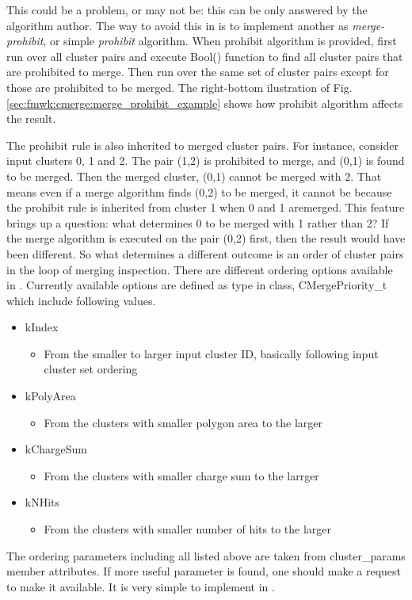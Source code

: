 This could be a problem, or may not be: this can be only answered by the algorithm author.
The way to avoid this in {\cmerge} is to implement another {\cmalgo} as {\it merge-prohibit}, or simple {\it prohibit} algorithm.
When prohibit algorithm is provided, {\cmerge} first run over all cluster pairs and execute {\ttfamily Bool()} function to find all cluster pairs that are prohibited to merge.
Then {\cmerge} run over the same set of cluster pairs except for those are prohibited to be merged.
The right-bottom ilustration of Fig.\ref{sec:fmwk:cmerge:merge_prohibit_example} shows how prohibit algorithm affects the result.

The prohibit rule is also inherited to merged cluster pairs. For instance, consider input clusters 0, 1 and 2. The pair (1,2) is prohibited to merge, and (0,1) is found to be merged. Then the merged cluster, (0,1) cannot be merged with 2. That means even if a merge algorithm finds (0,2) to be merged, it cannot be because the prohibit rule is inherited from cluster 1 when 0 and 1 aremerged. This feature brings up a question: what determines 0 to be merged with 1 rather than 2? If the merge algorithm is executed on the pair (0,2) first, then the result would have been different. So what determines a different outcome is an order of cluster pairs in the loop of merging inspection. There are different ordering options available in {\cmerge}. Currently available options are defined as {\enum} type in {\cmerge} class, {\ttfamily CMergePriority\_t} which include following values.
\begin{itemize}
\item[] {\ttfamily kIndex}
  \begin{itemize}
    \item From the smaller to larger input cluster ID, basically following input cluster set ordering
  \end{itemize}

\item[] {\ttfamily kPolyArea}
  \begin{itemize}
    \item From the clusters with smaller polygon area to the larger
  \end{itemize}

\item[] {\ttfamily kChargeSum}
  \begin{itemize}
    \item From the clusters with smaller charge sum to the larrger
  \end{itemize}

\item[] {\ttfamily kNHits}
  \begin{itemize}
    \item From the clusters with smaller number of hits to the larger
  \end{itemize}

\end{itemize}
The ordering parameters including all listed above are taken from {\ttfamily cluster\_params} member attributes.
If more useful parameter is found, one should make a request to make it available. 
It is very simple to implement in {\cmerge}.

